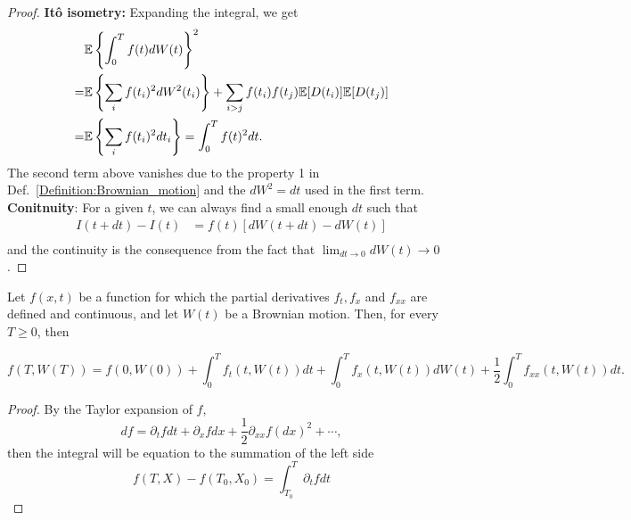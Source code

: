 \begin{proof}
\textbf{It\^{o} isometry:} Expanding the integral, we get
\begin{equation*}
\begin{aligned}
&\mathbb{E}\left\{\int_0^Tf(t)dW(t)\right\}^2\\
=&\mathbb{E}\left\{\sum_if(t_i)^2dW^2(t_i)\right\}+\sum_{i>j}f(t_i)f(t_j)\mathbb{E}[D(t_i)]\mathbb{E}[D(t_j)]\\
=&\mathbb{E}\left\{\sum_if(t_i)^2dt_i\right\}=\int_0^Tf(t)^2dt.
\end{aligned}
\end{equation*} 
The second term above vanishes due to the property 1 in Def.~\ref{Definition:Brownian_motion} and the $dW^2=dt$ used in the first term.
\textbf{Conitnuity}: For a given $t$, we can always find a small enough $dt$ such that
\begin{equation*}
\begin{aligned}
I(t+dt)-I(t)&=f(t)[dW(t+dt)-dW(t)]\\
\end{aligned}
\end{equation*}
and the continuity is the consequence from the fact that $\lim_{dt\to0}dW(t)\to 0$. 
\end{proof}

\begin{theorem}
Let $f(x,t)$ be a function for which the partial derivatives $f_t,f_x$ and $f_{xx}$ are defined and continuous, and let $W(t)$ be a Brownian motion. Then, for every $T\ge0$, then
\begin{widetext}
\begin{equation}
f(T,W(T))=f(0,W(0))+\int_0^T f_t(t,W(t))dt+\int_0^Tf_x(t,W(t))dW(t)+\frac{1}{2}\int_0^Tf_{xx}(t,W(t))dt.
\end{equation}
\end{widetext}
\end{theorem}

\begin{proof}
By the Taylor expansion of $f$,
\begin{equation}
df=\partial_t f dt+\partial_xfdx+\frac{1}{2}\partial_{xx}f(dx)^2+\cdots,
\end{equation}
then the integral will be equation to the summation of the left side
\begin{equation}
f(T,X)-f(T_0,X_0)=\int_{T_0}^T\partial_t f dt
\end{equation}
\end{proof}